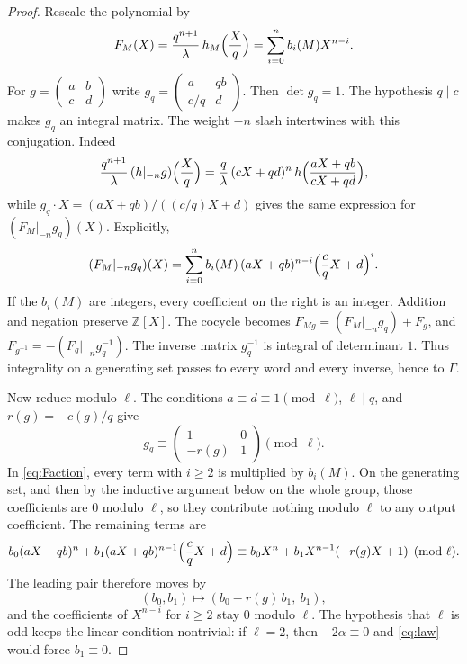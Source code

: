\documentclass[11pt]{article}
\theoremstyle{remark}
\newcommand{\Z}{\mathbb{Z}}
\begin{document}
\begin{proof}
Rescale the polynomial by
\[
F_M(X)=\frac{q^{n+1}}{\lambda}\,h_M\Bigl(\frac{X}{q}\Bigr)=\sum_{i=0}^{n}b_i(M)X^{n-i}.
\]
For \(g=\begin{pmatrix}a&b\\c&d\end{pmatrix}\) write \(g_q=\begin{pmatrix}a&qb\\c/q&d\end{pmatrix}\).
Then \(\det g_q=1\).
The hypothesis \(q\mid c\) makes \(g_q\) an integral matrix.
The weight \(-n\) slash intertwines with this conjugation.
Indeed
\[
\frac{q^{n+1}}{\lambda}\,(h|_{-n}g)\Bigl(\frac{X}{q}\Bigr)
=\frac{q}{\lambda}\,(cX+qd)^n\,
h\Bigl(\frac{aX+qb}{cX+qd}\Bigr),
\]
while \(g_q\cdot X=(aX+qb)/((c/q)X+d)\) gives the same expression for \((F_M|_{-n}g_q)(X)\).
Explicitly,
\begin{equation}
\label{eq:Faction}
(F_M|_{-n}g_q)(X)
=\sum_{i=0}^{n}b_i(M)\,(aX+qb)^{n-i}\Bigl(\frac{c}{q}X+d\Bigr)^{i}.
\end{equation}
If the \(b_i(M)\) are integers, every coefficient on the right is an integer.
Addition and negation preserve \(\Z[X]\).
The cocycle becomes \(F_{Mg}=(F_M|_{-n}g_q)+F_g\), and \(F_{g^{-1}}=-(F_g|_{-n}g_q^{-1})\).
The inverse matrix \(g_q^{-1}\) is integral of determinant \(1\).
Thus integrality on a generating set passes to every word and every inverse, hence to \(\Gamma\).

Now reduce modulo \(\ell\).
The conditions \(a\equiv d\equiv 1\pmod{\ell}\), \(\ell\mid q\), and \(r(g)=-c(g)/q\) give
\[
g_q\equiv\begin{pmatrix}1&0\\-r(g)&1\end{pmatrix}\pmod{\ell}.
\]
In \eqref{eq:Faction}, every term with \(i\ge 2\) is multiplied by \(b_i(M)\).
On the generating set, and then by the inductive argument below on the whole group, those coefficients are \(0\) modulo \(\ell\), so they contribute nothing modulo \(\ell\) to any output coefficient.
The remaining terms are
\[
b_0(aX+qb)^n+b_1(aX+qb)^{n-1}\Bigl(\frac{c}{q}X+d\Bigr)
\equiv b_0 X^n+b_1 X^{n-1}(-r(g)X+1)\pmod{\ell}.
\]
The leading pair therefore moves by
\begin{equation}
\label{eq:unipotent}
(b_0,b_1)\longmapsto(b_0-r(g)\,b_1,\ b_1),
\end{equation}
and the coefficients of \(X^{n-i}\) for \(i\ge 2\) stay \(0\) modulo \(\ell\).
The hypothesis that \(\ell\) is odd keeps the linear condition nontrivial: if \(\ell=2\), then \(-2\alpha\equiv 0\) and \eqref{eq:law} would force \(b_1\equiv 0\).


\end{proof}
\end{document}
